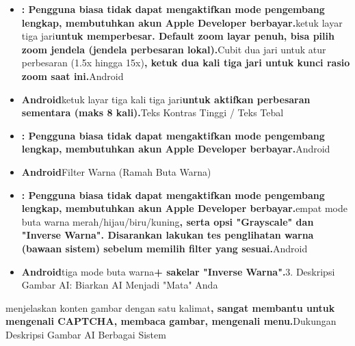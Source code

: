 

\begin{itemize}
  \item \textbf{: Pengguna biasa tidak dapat mengaktifkan mode pengembang lengkap, membutuhkan akun Apple Developer berbayar.}ketuk layar tiga jari\textbf{untuk memperbesar. Default zoom layar penuh, bisa pilih zoom jendela (jendela perbesaran lokal).}Cubit dua jari untuk atur perbesaran (1.5x hingga 15x)\textbf{, ketuk dua kali tiga jari untuk kunci rasio zoom saat ini.}Android
  \item \textbf{Android}ketuk layar tiga kali tiga jari\textbf{untuk aktifkan perbesaran sementara (maks 8 kali).}Teks Kontras Tinggi / Teks Tebal
\end{itemize}


\begin{itemize}
  \item \textbf{: Pengguna biasa tidak dapat mengaktifkan mode pengembang lengkap, membutuhkan akun Apple Developer berbayar.}Android
  \item \textbf{Android}Filter Warna (Ramah Buta Warna)
\end{itemize}


\begin{itemize}
  \item \textbf{: Pengguna biasa tidak dapat mengaktifkan mode pengembang lengkap, membutuhkan akun Apple Developer berbayar.}empat mode buta warna merah/hijau/biru/kuning\textbf{, serta opsi "Grayscale" dan "Inverse Warna". Disarankan lakukan tes penglihatan warna (bawaan sistem) sebelum memilih filter yang sesuai.}Android
  \item \textbf{Android}tiga mode buta warna\textbf{+ sakelar "Inverse Warna".}3. Deskripsi Gambar AI: Biarkan AI Menjadi "Mata" Anda
\end{itemize}


menjelaskan konten gambar dengan satu kalimat\textbf{, sangat membantu untuk mengenali CAPTCHA, membaca gambar, mengenali menu.}Dukungan Deskripsi Gambar AI Berbagai Sistem

